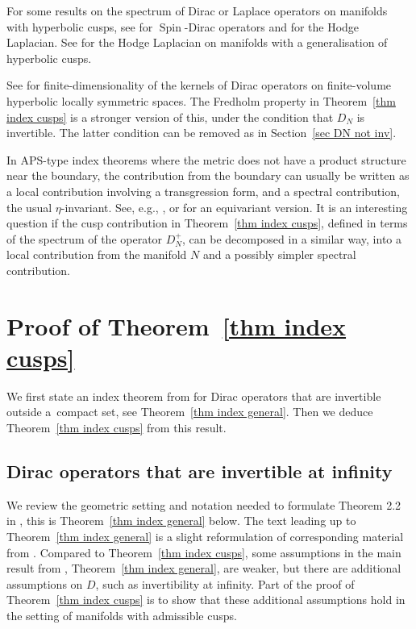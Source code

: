 \documentclass[10pt,a4paper]{amsart}
\numberwithin{equation}{section}
\DeclareMathOperator{\Spin}{Spin}
\begin{document}
For some results on the spectrum of Dirac or Laplace operators on manifolds with hyperbolic cusps, see \cite{Baer00} for $\Spin$-Dirac operators and \cite{MP90} for the Hodge Laplacian. See \cite{Moroianu07} for the Hodge Laplacian on manifolds with a generalisation of hyperbolic cusps.

See \cite{Moscovici82} for finite-dimensionality of the kernels of Dirac operators on finite-volume hyperbolic locally symmetric spaces. The Fredholm property in Theorem~\ref{thm index cusps} is a stronger version of this, under the condition that $D_N$ is invertible. The latter condition can be removed as in Section~\ref{sec DN not inv}.

In APS-type index theorems where the metric does not have a product structure near the boundary, the contribution from the boundary can usually be written as a local contribution involving a transgression form, and a spectral contribution, the usual $\eta$-invariant. See, e.g., \cite{Gilkey93, Grubb92, Salomonsen98}, or \cite{BM19} for an equivariant version. It is an interesting question if the cusp contribution in Theorem~\ref{thm index cusps}, defined in terms of the spectrum of the operator $D_N^+$, can be decomposed in a similar way, into a local contribution from the manifold $N$ and a possibly simpler spectral contribution.


\section{Proof of Theorem~\ref{thm index cusps}}


We first state an index theorem from \cite{HW21a} for Dirac operators that are invertible outside a~compact set, see Theorem~\ref{thm index general}. Then we deduce Theorem~\ref{thm index cusps} from this result.



\subsection{Dirac operators that are invertible at infinity}\label{sec dirac ops}

We review the geometric setting and notation needed to formulate Theorem 2.2 in \cite{HW21a}, this is Theorem~\ref{thm index general} below. The text leading up to Theorem~\ref{thm index general} is a slight reformulation of corresponding material from \cite{HW21a}. Compared to Theorem~\ref{thm index cusps}, some assumptions in
 the main result from \cite{HW21a}, Theorem~\ref{thm index general}, are weaker, but there are additional assumptions on $D$, such as invertibility at infinity.
 Part of the proof of Theorem~\ref{thm index cusps} is to show that these additional assumptions hold in the setting of manifolds with admissible cusps.
\end{document}
